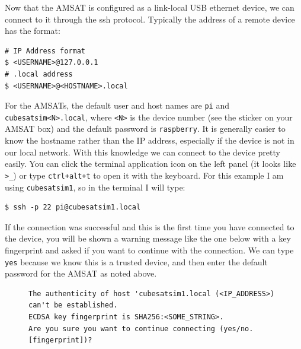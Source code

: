 \documentclass{tufte-book}
\begin{document}

Now that the AMSAT is configured as a link-local USB ethernet device, we can connect to it through the ssh protocol. Typically the address of a remote device has the format:

\begin{lstlisting}[backgroundcolor=\color{lightgray}]
# IP Address format
$ <USERNAME>@127.0.0.1
# .local address
$ <USERNAME>@<HOSTNAME>.local
\end{lstlisting}

For the AMSATs, the default user and host names are \verb|pi| and \verb|cubesatsim<N>.local|, where \verb|<N>| is the device number (see the sticker on your AMSAT box) and the default password is \verb|raspberry|. It is generally easier to know the hostname rather than the IP address, especially if the device is not in our local network. With this knowledge we can connect to the device pretty easily. You can click the terminal application icon on the left panel (it looks like \verb|>_|) or type \verb|ctrl+alt+t| to open it with the keyboard. For this example I am using \verb|cubesatsim1|, so in the terminal I will type:

\begin{lstlisting}[backgroundcolor=\color{lightgray}]
$ ssh -p 22 pi@cubesatsim1.local
\end{lstlisting}

If the connection was successful and this is the first time you have connected to the device, you will be shown a warning message like the one below with a key fingerprint and asked if you want to continue with the connection. We can type \verb|yes| because we know this is a trusted device, and then enter the default password for the AMSAT as noted above.

\begin{figure}[h]
\begin{lstlisting}[backgroundcolor=\color{lightgray}, breaklines=true]
The authenticity of host 'cubesatsim1.local (<IP_ADDRESS>) can't be established.
ECDSA key fingerprint is SHA256:<SOME_STRING>.
Are you sure you want to continue connecting (yes/no.[fingerprint])?
\end{lstlisting}
\end{figure}
\end{document}
